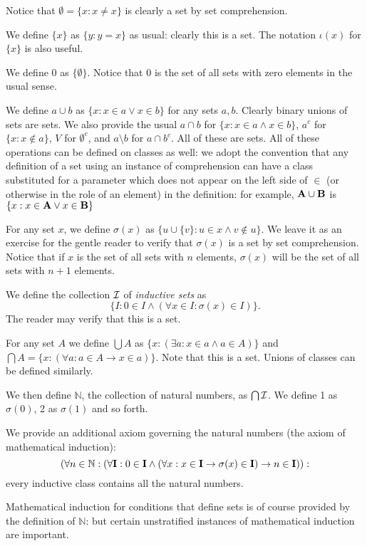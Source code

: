 \documentclass[12pt]{article}
\begin{document}
Notice that $\emptyset = \{x : x \neq x\}$ is clearly a set by set comprehension.

We define $\{x\}$ as $\{y : y=x\}$ as usual:  clearly this is a set.  The notation $\iota(x)$ for $\{x\}$ is also useful.

We define 0 as $\{\emptyset\}$.  Notice that 0 is the set of all sets with zero elements in the usual sense.

We define $a \cup b$ as $\{x : x\in a \vee x \in b\}$ for any sets $a,b$.   Clearly binary unions of sets are sets.
We also provide the usual $a \cap b$ for $\{x : x\in a \wedge x \in b\}$, $a^c$ for $\{x : x \not\in a\}$, $V$ for $\emptyset^c$, and $a \setminus b$ for $a \cap b^c$.  All of these are sets.  All of these operations can be defined on classes as well:  we adopt the convention that any definition of a set using an instance of comprehension can have a class substituted for a parameter which does not appear on the left side of $\in$ (or otherwise in the role of an element)  in the definition:  for example, ${\bf A} \cup {\bf B}$ is $\{x : x\in {\bf A} \vee x \in {\bf B}\}$

For any set $x$, we define $\sigma(x)$ as $\{u \cup \{v\}:u \in x \wedge v \not\in u\}$.  We leave it as an exercise for the gentle reader to verify that $\sigma(x)$ is a set by set comprehension.  Notice that if $x$ is the set of all sets with $n$ elements, $\sigma(x)$ will be the set of all sets with $n+1$ elements.

We define the collection $\cal I$ of {\em inductive sets\/} as $$\{I : 0 \in I \wedge (\forall x \in I:\sigma(x) \in I)\}.$$  The reader may verify that this is a set.

For any set $A$ we define $\bigcup A$ as $\{x : (\exists a:x \in a \wedge a \in A)\}$ and $\bigcap A = \{x: (\forall a:a \in A \rightarrow x \in a)\}$.  Note that this is a set.  Unions of classes can be defined similarly.

We then define $\mathbb N$, the collection of natural numbers, as $\bigcap \cal I$.  We define 1 as $\sigma(0)$, 2 as $\sigma(1)$ and so forth.

We provide an additional axiom governing the natural numbers (the axiom of mathematical induction):  $$(\forall n \in \mathbb N:(\forall {\bf I}: 0 \in {\bf I} \wedge (\forall x:x \in {\bf I} \rightarrow \sigma(x) \in {\bf I}) \rightarrow n \in {\bf I})):$$  every inductive class contains all the natural numbers.

Mathematical induction for conditions that define sets is of course provided by the definition of $\mathbb N$:  but certain unstratified instances of mathematical induction are important.
\end{document}
